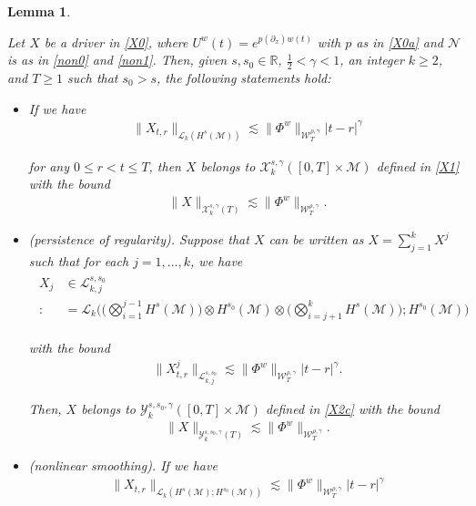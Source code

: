 \documentclass[letterpaper, 11pt,  reqno]{amsart}
\newtheorem{lemma}[theorem]{Lemma}
\newcommand{\1}{\hspace{0.5mm}\text{I}\hspace{0.5mm}}
\newcommand{\noi}{\noindent}
\newcommand{\R}{\mathbb{R}}
\newcommand{\g}{\gamma}
\newcommand{\dx}{\partial_x}
\newcommand{\les}{\lesssim}
\newcommand{\M}{\mathcal{M}}
\newcommand{\NN}{\mathcal{N}}
\newcommand{\cL}{\mathcal{L}}
\newcommand{\cX}{\mathcal{X}}
\newcommand{\cY}{\mathcal{Y}}
\newcommand{\W}{\mathcal{W}}
\numberwithin{equation}{section}
\numberwithin{theorem}{section}
\begin{document}
\begin{lemma}\label{LEM:OBS1}

Let $X$ be a driver in \eqref{X0}, 
where $U^w(t) = e^{p(\dx) w(t)}$ with $p$ as in \eqref{X0a}
and $\NN$ is as in \eqref{non0} and \eqref{non1}.
Then, given  $s, s_0 \in \R$, $\frac 12 < \g < 1$, an integer $k \ge 2$,  and $T \ge 1$
such that $s_0 > s$, 
the following statements hold\textup{:}



\smallskip
\begin{itemize}
\item[(i)] 
If we have 
\begin{align*}
\|X_{t,r}\|_{\cL_k(H^s(\M))}
\les 
\|\Phi^w\|_{\W^{\rho,\g}_T}
|t-r|^{\g}
\end{align*}

\noi
for any $0 \le r < t \le T$, 
then
 $X$ belongs to $\cX^{s, \g}_k([0, T]\times \M)$
 defined in 
 \eqref{X1}
with the bound 
\begin{align*}
\|X\|_{\cX^{s, \g}_k(T)} \les \|\Phi^w\|_{\W^{\rho,\g}_T}.
\end{align*}




\smallskip
\item[(ii)] \textup{(persistence of regularity).}
Suppose that $X$ can be written as  $X = \sum_{j = 1}^k X^j$
such that for each $j = 1, \dots, k$, we have 
\begin{align}
\begin{split}
X_j &\in \cL_{k, j}^{s, s_0}\\ :\!&=
\cL_k\Big(\big(\bigotimes_{i  = 1}^{j-1}H^{s}(\M)\big) \otimes
H^{s_0}(\M) 
\otimes \big(\bigotimes_{i  = j+1}^{k}H^{s}(\M)\big); H^{s_0}(\M)\Big)
\end{split}
\label{X5}
\end{align}

\noi
with the bound
\begin{align*}
\|X^j_{t,r}\|_{\cL_{k, j}^{s, s_0}}
\les 
\|\Phi^w\|_{\W^{\rho,\g}_T}
|t-r|^{\g}.
\end{align*}

\noi
Then, 
 $X$ belongs to $ \cY^{s, s_0, \g}_k([0, T]\times \M)$
 defined  in \eqref{X2c}
 with the bound 
\begin{align*}
\|X\|_{\cY^{s,s_0,  \g}_k(T)} \les \|\Phi^w\|_{\W^{\rho,\g}_T}.
\end{align*}



\smallskip
\item[(iii)] \textup{(nonlinear smoothing).}
If we have 
\begin{align*}
\|X_{t,r}\|_{\cL_k(H^s(\M); H^{s_0}(\M))}
\les 
\|\Phi^w\|_{\W^{\rho,\g}_T}
|t-r|^{\g}
\end{align*}


\end{itemize}
\end{lemma}
\end{document}
